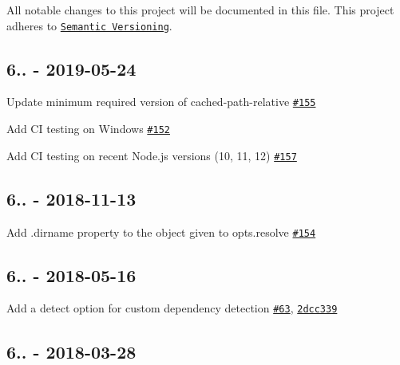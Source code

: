All notable changes to this project will be documented in this file. This project adheres to \href{http://semver.org/}{\tt Semantic Versioning}.

\subsection*{6.. -\/ 2019-\/05-\/24}


\begin{DoxyItemize}
\item Update minimum required version of {\ttfamily cached-\/path-\/relative} \href{https://github.com/browserify/module-deps/pull/155}{\tt \#155}
\item Add CI testing on Windows \href{https://github.com/browserify/module-deps/pull/152}{\tt \#152}
\item Add CI testing on recent Node.\+js versions (10, 11, 12) \href{https://github.com/browserify/module-deps/pull/157}{\tt \#157}
\end{DoxyItemize}

\subsection*{6.. -\/ 2018-\/11-\/13}


\begin{DoxyItemize}
\item Add {\ttfamily .dirname} property to the object given to {\ttfamily opts.\+resolve} \href{https://github.com/browserify/module-deps/pull/154}{\tt \#154}
\end{DoxyItemize}

\subsection*{6.. -\/ 2018-\/05-\/16}


\begin{DoxyItemize}
\item Add a {\ttfamily detect} option for custom dependency detection \href{https://github.com/browserify/module-deps/pull/63}{\tt \#63}, \href{https://github.com/browserify/module-deps/commit/2dcc3399ee67ba51ed26d9a0605a8ccdc70c9db7}{\tt 2dcc339}
\end{DoxyItemize}

\subsection*{6.. -\/ 2018-\/03-\/28}


